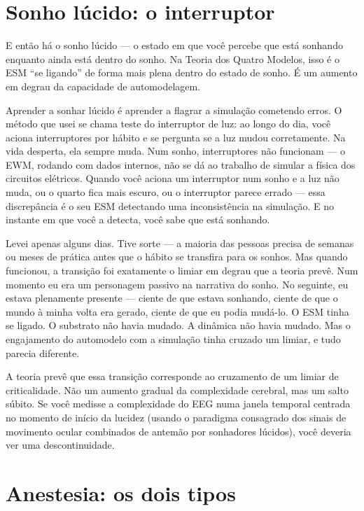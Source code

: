 \documentclass[11pt, twoside, openright]{book}
\begin{document}
\section*{Sonho lúcido: o interruptor}

E então há o sonho lúcido --- o estado em que você percebe que está sonhando enquanto ainda está dentro do sonho. Na Teoria dos Quatro Modelos, isso é o ESM ``se ligando'' de forma mais plena dentro do estado de sonho. É um aumento em degrau da capacidade de automodelagem.

Aprender a sonhar lúcido é aprender a flagrar a simulação cometendo erros. O método que usei se chama teste do interruptor de luz: ao longo do dia, você aciona interruptores por hábito e se pergunta se a luz mudou corretamente. Na vida desperta, ela sempre muda. Num sonho, interruptores não funcionam --- o EWM, rodando com dados internos, não se dá ao trabalho de simular a física dos circuitos elétricos. Quando você aciona um interruptor num sonho e a luz não muda, ou o quarto fica mais escuro, ou o interruptor parece errado --- essa discrepância é o seu ESM detectando uma inconsistência na simulação. E no instante em que você a detecta, você sabe que está sonhando.

Levei apenas alguns dias. Tive sorte --- a maioria das pessoas precisa de semanas ou meses de prática antes que o hábito se transfira para os sonhos. Mas quando funcionou, a transição foi exatamente o limiar em degrau que a teoria prevê. Num momento eu era um personagem passivo na narrativa do sonho. No seguinte, eu estava plenamente presente --- ciente de que estava sonhando, ciente de que o mundo à minha volta era gerado, ciente de que eu podia mudá-lo. O ESM tinha se ligado. O substrato não havia mudado. A dinâmica não havia mudado. Mas o engajamento do automodelo com a simulação tinha cruzado um limiar, e tudo parecia diferente.

A teoria prevê que essa transição corresponde ao cruzamento de um limiar de criticalidade. Não um aumento gradual da complexidade cerebral, mas um salto súbito. Se você medisse a complexidade do EEG numa janela temporal centrada no momento de início da lucidez (usando o paradigma consagrado dos sinais de movimento ocular combinados de antemão por sonhadores lúcidos), você deveria ver uma descontinuidade.

\section*{Anestesia: os dois tipos}
\end{document}

